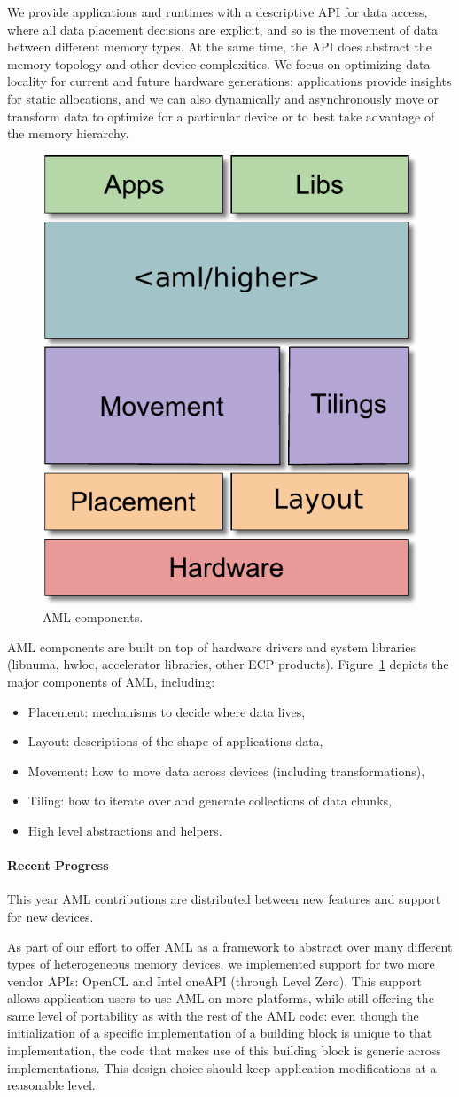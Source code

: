 We provide applications and runtimes with a descriptive API for data
access, where all data placement decisions are explicit, and so is the
movement of data between different memory types.  At the same time, the API
does abstract the memory topology and other device complexities.  We focus
on optimizing data locality for current and future hardware generations;
applications provide insights for static allocations, and we can also
dynamically and asynchronously move or transform data to optimize for a particular 
device or to best take advantage of the memory hierarchy.

\begin{figure}
\vspace{-12pt}
\includegraphics[width=.18\textwidth]{projects/2.3.1-PMR/2.3.1.19-Argo-PowerSteering/aml-components}
\caption{AML components.}
\label{fig:aml-components}
\end{figure}
AML components are built on top of hardware drivers and system
libraries (libnuma, hwloc, accelerator libraries, other ECP products).
Figure~\ref{fig:aml-components} depicts the major components of AML, including:
\begin{itemize}
\item Placement: mechanisms to decide where data lives,
\item Layout: descriptions of the shape of applications data,
\item Movement: how to move data across devices (including transformations),
\item Tiling: how to iterate over and generate collections of data chunks,
\item High level abstractions and helpers.
\end{itemize}

\paragraph{Recent Progress}

This year AML contributions are distributed between new features and
support for new devices.

As part of our effort to offer AML as a framework to abstract over many
different types of heterogeneous memory devices, we implemented support for
two more vendor APIs: OpenCL and Intel oneAPI (through Level Zero). This
support allows application users to use AML on more platforms, while still
offering the same level of portability as with the rest of the AML code:
even though the initialization of a specific implementation of a building
block is unique to that implementation, the code that makes use of this
building block is generic across implementations. This design choice should
keep application modifications at a reasonable level.

